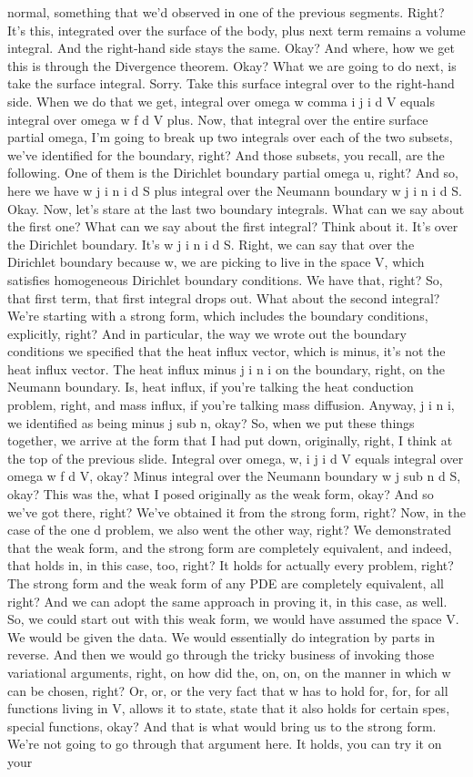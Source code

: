 \documentclass[10pt]{article}
\begin{document}
normal, something that we'd observed in one of the previous segments. Right? It's this, integrated over the surface of the body, plus next term remains a volume integral. And the right-hand side stays the same. Okay? And where, how we get this is through the Divergence theorem. Okay? What we are going to do next, is take the surface integral. Sorry. Take this surface integral over to the right-hand side. When we do that we get, integral over omega w comma i j i d V equals integral over omega w f d V plus. Now, that integral over the entire surface partial omega, I'm going to break up two integrals over each of the two subsets, we've identified for the boundary, right? And those subsets, you recall, are the following. One of them is the Dirichlet boundary partial omega u, right? And so, here we have w j i n i d S plus integral over the Neumann boundary w j i n i d S. Okay. Now, let's stare at the last two boundary integrals. What can we say about the first one? What can we say about the first integral? Think about it. It's over the Dirichlet boundary. It's w j i n i d S. Right, we can say that over the Dirichlet boundary because w, we are picking to live in the space V, which satisfies homogeneous Dirichlet boundary conditions. We have that, right? So, that first term, that first integral drops out. What about the second integral? We're starting with a strong form, which includes the boundary conditions, explicitly, right? And in particular, the way we wrote out the boundary conditions we specified that the heat influx vector, which is minus, it's not the heat influx vector. The heat influx minus j i n i on the boundary, right, on the Neumann boundary. Is, heat influx, if you're talking the heat conduction problem, right, and mass influx, if you're talking mass diffusion. Anyway, j i n i, we identified as being minus j sub n, okay? So, when we put these things together, we arrive at the form that I had put down, originally, right, I think at the top of the previous slide. Integral over omega, w, i j i d V equals integral over omega w f d V, okay? Minus integral over the Neumann boundary w j sub n d S, okay? This was the, what I posed originally as the weak form, okay? And so we've got there, right? We've obtained it from the strong form, right? Now, in the case of the one d problem, we also went the other way, right? We demonstrated that the weak form, and the strong form are completely equivalent, and indeed, that holds in, in this case, too, right? It holds for actually every problem, right? The strong form and the weak form of any PDE are completely equivalent, all right? And we can adopt the same approach in proving it, in this case, as well. So, we could start out with this weak form, we would have assumed the space V. We would be given the data. We would essentially do integration by parts in reverse. And then we would go through the tricky business of invoking those variational arguments, right, on how did the, on, on, on the manner in which w can be chosen, right? Or, or, or the very fact that w has to hold for, for, for all functions living in V, allows it to state, state that it also holds for certain spes, special functions, okay? And that is what would bring us to the strong form. We're not going to go through that argument here. It holds, you can try it on your 
\end{document}

